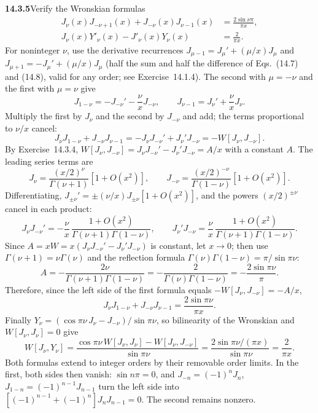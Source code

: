 \par\bigskip
\noindent\textbf{14.3.5}\quad Verify the Wronskian formulas
\begin{align*}
J_{\nu}(x)J_{-\nu+1}(x)+J_{-\nu}(x)J_{\nu-1}(x)
&=\frac{2\sin\nu\pi}{\pi x},\\
J_{\nu}(x)Y'_{\nu}(x)-J'_{\nu}(x)Y_{\nu}(x)&=\frac{2}{\pi x}.
\end{align*}
\solution
For noninteger $\nu$, use the derivative recurrences
$J_{\mu-1}=J_\mu'+(\mu/x)J_\mu$ and $J_{\mu+1}=-J_\mu'+(\mu/x)J_\mu$
(half the sum and half the difference of Eqs.~(14.7) and (14.8),
valid for any order; see Exercise~14.1.4). The second with $\mu=-\nu$
and the first with $\mu=\nu$ give
\[
J_{1-\nu}=-J_{-\nu}'-\frac\nu xJ_{-\nu},\qquad
J_{\nu-1}=J_\nu'+\frac\nu xJ_\nu.
\]
Multiply the first by $J_\nu$ and the second by $J_{-\nu}$ and add;
the terms proportional to $\nu/x$ cancel:
\[
J_\nu J_{1-\nu}+J_{-\nu}J_{\nu-1}
=-J_\nu J_{-\nu}'+J_\nu'J_{-\nu}
=-W[J_\nu,J_{-\nu}].
\]
By Exercise~14.3.4, $W[J_\nu,J_{-\nu}]=J_\nu J_{-\nu}'-J_\nu'J_{-\nu}
=A/x$ with a constant $A$. The leading series terms are
\[
J_\nu=\frac{(x/2)^\nu}{\Gamma(\nu+1)}[1+O(x^2)],\qquad
J_{-\nu}=\frac{(x/2)^{-\nu}}{\Gamma(1-\nu)}[1+O(x^2)].
\]
Differentiating, $J_{\pm\nu}'=\pm(\nu/x)J_{\pm\nu}[1+O(x^2)]$, and
the powers $(x/2)^{\pm\nu}$ cancel in each product:
\[
J_\nu J_{-\nu}'=-\frac{\nu}{x}\,
\frac{1+O(x^2)}{\Gamma(\nu+1)\Gamma(1-\nu)},\qquad
J_\nu'J_{-\nu}=\frac{\nu}{x}\,
\frac{1+O(x^2)}{\Gamma(\nu+1)\Gamma(1-\nu)}.
\]
Since $A=xW=x(J_\nu J_{-\nu}'-J_\nu'J_{-\nu})$ is constant, let
$x\to0$; then use $\Gamma(\nu+1)=\nu\Gamma(\nu)$ and the reflection
formula $\Gamma(\nu)\Gamma(1-\nu)=\pi/\sin\pi\nu$:
\[
A=-\frac{2\nu}{\Gamma(\nu+1)\Gamma(1-\nu)}
=-\frac{2}{\Gamma(\nu)\Gamma(1-\nu)}
=-\frac{2\sin\pi\nu}{\pi}.
\]
Therefore, since the left side of the first formula equals
$-W[J_\nu,J_{-\nu}]=-A/x$,
\[
\boxed{J_\nu J_{1-\nu}+J_{-\nu}J_{\nu-1}
=\frac{2\sin\pi\nu}{\pi x}}.
\]
Finally $Y_\nu=(\cos\pi\nu\,J_\nu-J_{-\nu})/\sin\pi\nu$,
so bilinearity of the Wronskian and $W[J_\nu,J_\nu]=0$ give
\[
W[J_\nu,Y_\nu]
=\frac{\cos\pi\nu\,W[J_\nu,J_\nu]-W[J_\nu,J_{-\nu}]}{\sin\pi\nu}
=\frac{2\sin\pi\nu/(\pi x)}{\sin\pi\nu}
=\boxed{\frac2{\pi x}}.
\]
Both formulas extend to integer orders by their removable order
limits. In the first, both sides then vanish: $\sin n\pi=0$, and
$J_{-n}=(-1)^nJ_n$, $J_{1-n}=(-1)^{n-1}J_{n-1}$ turn the left side
into $[(-1)^{n-1}+(-1)^n]J_nJ_{n-1}=0$. The second remains nonzero.

